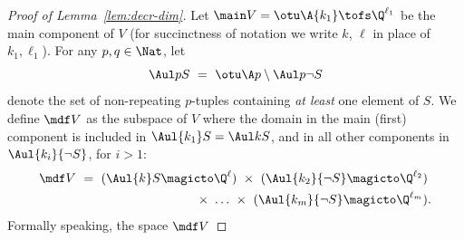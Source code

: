 \begin{proof}[Proof of Lemma~\ref{lem:decr-dim}]
Let $\main V = \otu \A {k_1} \tofs \Q^{\ell_1}$ be the main component of $V$ 
(for succinctness of notation we write $k$, $\ell$ in place of $k_1, \ell_1$).
For any $p, q \in\Nat$, 
let 
\[
\Aul p {S} \ = \ \otu \A p \setminus \Aul p {\neg S}
\]
denote the set of non-repeating $p$-tuples containing \emph{at least} one element of $S$.
We define $\mdf V$ as 
the subspace of $V$ where the domain in the main (first) component is included in $\Aul {k_1} S = \Aul k S$,
and in all other components in $\Aul {k_i} {\neg S}$, for $i>1$:
\begin{align} \label{eq:mdfV}
\begin{aligned}
\mdf V \ = \  ({\Aul {k} S} \magicto \Q^{\ell})\  \times \ 
({\Aul {k_2} {\neg S}} \magicto \Q^{\ell_2})  & \\
 \ \times \ \ldots \ \times \ 
({\Aul {k_m} {\neg S}} \magicto \Q^{\ell_m})&. 
\end{aligned}
\end{align}
%
Formally speaking, the space $\mdf V$
%
%

\end{proof}
